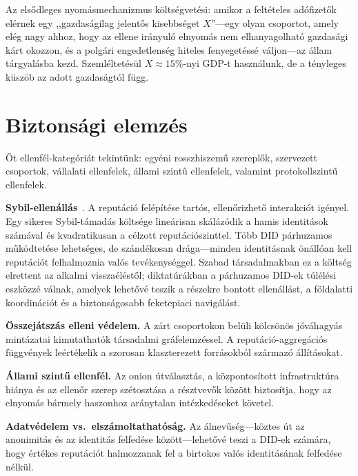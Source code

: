 \documentclass[11pt,a4paper,twocolumn]{article}
\begin{document}
Az elsődleges nyomásmechanizmus költségvetési: amikor a feltételes adófizetők elérnek egy ,,gazdaságilag jelentős kisebbséget $X$''---egy olyan csoportot, amely elég nagy ahhoz, hogy az ellene irányuló elnyomás nem elhanyagolható gazdasági kárt okozzon, és a polgári engedetlenség hiteles fenyegetéssé váljon---az állam tárgyalásba kezd. Szemléltetésül $X \approx 15\%$-nyi GDP-t használunk, de a tényleges küszöb az adott gazdaságtól függ.

\section{Biztonsági elemzés}

Öt ellenfél-kategóriát tekintünk: egyéni rosszhiszemű szereplők, szervezett csoportok, vállalati ellenfelek, állami szintű ellenfelek, valamint protokollszintű ellenfelek.

\textbf{Sybil-ellenállás}~\cite{douceur2002}. A reputáció felépítése tartós, ellenőrizhető interakciót igényel. Egy sikeres Sybil-támadás költsége lineárisan skálázódik a hamis identitások számával és kvadratikusan a célzott reputációszinttel. Több DID párhuzamos működtetése lehetséges, de szándékosan drága---minden identitásnak önállóan kell reputációt felhalmoznia valós tevékenységgel. Szabad társadalmakban ez a költség elrettent az alkalmi visszaéléstől; diktatúrákban a párhuzamos DID-ek túlélési eszközzé válnak, amelyek lehetővé teszik a részekre bontott ellenállást, a földalatti koordinációt és a biztonságosabb feketepiaci navigálást.

\textbf{Összejátszás elleni védelem.} A zárt csoportokon belüli kölcsönös jóváhagyás mintázatai kimutathatók társadalmi gráfelemzéssel. A reputáció-aggregációs függvények leértékelik a szorosan klaszterezett forrásokból származó állításokat.

\textbf{Állami szintű ellenfél.} Az onion útválasztás, a központosított infrastruktúra hiánya és az ellenőr szerep szétosztása a résztvevők között biztosítja, hogy az elnyomás bármely haszonhoz aránytalan intézkedéseket követel.

\textbf{Adatvédelem vs.\ elszámoltathatóság.} Az álnevűség---köztes út az anonimitás és az identitás felfedése között---lehetővé teszi a DID-ek számára, hogy értékes reputációt halmozzanak fel a birtokos valós identitásának felfedése nélkül.
\end{document}
